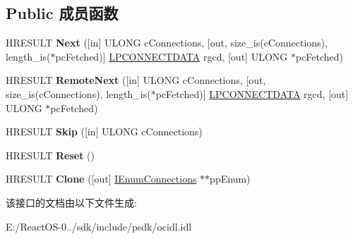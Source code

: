 \subsection*{Public 成员函数}
\begin{DoxyCompactItemize}
\item 
\mbox{\label{interface_i_enum_connections_aca918ca710474790bbf2df1e9169e070}} 
H\+R\+E\+S\+U\+LT {\bfseries Next} (\mbox{[}in\mbox{]} U\+L\+O\+NG c\+Connections, \mbox{[}out, size\+\_\+is(c\+Connections), length\+\_\+is($\ast$pc\+Fetched)\mbox{]} \hyperlink{struct_i_enum_connections_1_1tag_c_o_n_n_e_c_t_d_a_t_a}{L\+P\+C\+O\+N\+N\+E\+C\+T\+D\+A\+TA} rgcd, \mbox{[}out\mbox{]} U\+L\+O\+NG $\ast$pc\+Fetched)
\item 
\mbox{\label{interface_i_enum_connections_a8ceb1bb1fdc56b5a8afe246f8e9af818}} 
H\+R\+E\+S\+U\+LT {\bfseries Remote\+Next} (\mbox{[}in\mbox{]} U\+L\+O\+NG c\+Connections, \mbox{[}out, size\+\_\+is(c\+Connections), length\+\_\+is($\ast$pc\+Fetched)\mbox{]} \hyperlink{struct_i_enum_connections_1_1tag_c_o_n_n_e_c_t_d_a_t_a}{L\+P\+C\+O\+N\+N\+E\+C\+T\+D\+A\+TA} rgcd, \mbox{[}out\mbox{]} U\+L\+O\+NG $\ast$pc\+Fetched)
\item 
\mbox{\label{interface_i_enum_connections_afa3e587046bd2b2cea55cf4421ac96af}} 
H\+R\+E\+S\+U\+LT {\bfseries Skip} (\mbox{[}in\mbox{]} U\+L\+O\+NG c\+Connections)
\item 
\mbox{\label{interface_i_enum_connections_a0a791da64a5a15edd5487bb5c9bb30cc}} 
H\+R\+E\+S\+U\+LT {\bfseries Reset} ()
\item 
\mbox{\label{interface_i_enum_connections_a39e644cf0f8bcb1e834ea9e0eb70092b}} 
H\+R\+E\+S\+U\+LT {\bfseries Clone} (\mbox{[}out\mbox{]} \hyperlink{interface_i_enum_connections}{I\+Enum\+Connections} $\ast$$\ast$pp\+Enum)
\end{DoxyCompactItemize}


该接口的文档由以下文件生成\+:\begin{DoxyCompactItemize}
\item 
E\+:/\+React\+O\+S-\/0../sdk/include/psdk/ocidl.\+idl\end{DoxyCompactItemize}
